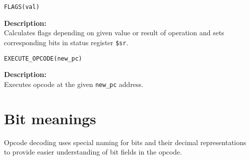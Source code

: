 \documentclass[oneside,english,a4paper,10pt,oneside,openany,final]{memoir}
\newcommand{\Function}[1]{\texttt{#1}}
\newcommand{\Register}[1]{\texttt{#1}}
\newcommand{\Variable}[1]{\texttt{#1}}
\begin{document}
\begin{description}
  \item \Function{FLAGS(val)}
  \begin{description}
    \item\textbf{Description:} \\
      Calculates flags depending on given value or result of operation and sets corresponding bits in status register \Register{\$sr}.
  \end{description}
\end{description}

\begin{description}
  \item \Function{EXECUTE\_OPCODE(new\_pc)}
  \begin{description}
    \item \textbf{Description:} \\
      Executes opcode at the given \Variable{new\_pc} address.
  \end{description}
\end{description}

\pagebreak{}

\section{Bit meanings}

Opcode decoding uses special naming for bits and their decimal representations to provide easier understanding of bit fields in the opcode.
\end{document}
